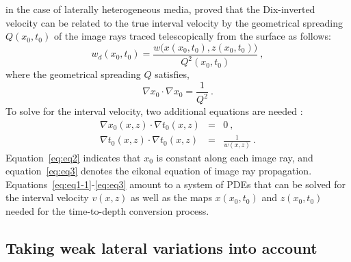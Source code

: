  in the case of laterally heterogeneous media, \cite{cam2007} proved that the Dix-inverted velocity can be related to the true interval velocity by the geometrical spreading $Q(x_0,t_0)$ of the image rays traced telescopically from the surface as follows:
\begin{equation}
\label{eq:eq1}
w_d(x_0,t_0) = \frac{w\big(x(x_0,t_0),z(x_0,t_0)\big)}{Q^2(x_0,t_0)}~,
\end{equation}
where the geometrical spreading $Q$ satisfies,
\begin{equation}
\label{eq:geomet}
\nabla x_0 \cdot \nabla x_0 = \frac{1}{Q^2}~.
\end{equation}
To solve for the interval velocity, two additional equations are needed \cite[]{cam2007,siweit2d}:
\begin{eqnarray}
\label{eq:eq2}
\nabla x_0 (x,z)\cdot \nabla t_0 (x,z)& = & 0~, \\
\label{eq:eq3}
\nabla t_0 (x,z) \cdot \nabla t_0 (x,z)& = & \frac{1}{w(x,z)}~.
\end{eqnarray}
Equation~\ref{eq:eq2} indicates that $x_0$ is constant along each image ray, and equation~\ref{eq:eq3} denotes the eikonal equation of image ray propagation. Equations~\ref{eq:eq1-1}-\ref{eq:eq3} amount to a system of PDEs that can be solved for the interval velocity $v(x,z)$ as well as the maps $x(x_0,t_0)$ and $z(x_0,t_0)$ needed for the time-to-depth conversion process.

\subsection{Taking weak lateral variations into account}

